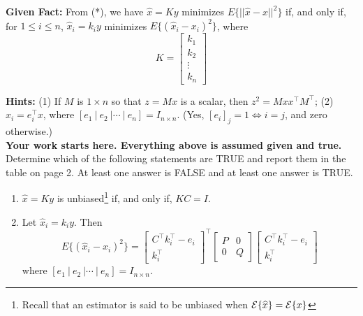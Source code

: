 \documentclass[letterpaper]{article}
\newcommand{\real}{\mathbb R}  %
\begin{document}
\begin{enumerate}
\begin{itemize}
  \end{itemize}

\noindent \textbf{Given Fact:} From (*), we have $\hat{x} = Ky$ minimizes $E\{ ||\hat{x} - x||^2 \} $ if, and only if, for $ 1 \le i \le n$,  $\hat{x}_i = k_i y$ minimizes $ E\{ \left( \hat{x}_i - x_i \right)^2 \}$, where $$K=\left[ \begin{array}{r}  k_1  \\  k_2 \\   \vdots \\ k_n\end{array} \right] $$


\textbf{Hints:} (1)  If $M$ is $1 \times n$ so that $z = Mx$ is a scalar, then $z^2 = M x x^\top M^\top$; (2) $x_i = e_i^\top x$, where $[e_1~|~e_2~| \cdots ~|~e_n] = I_{n \times n}$. (Yes, $[e_i]_j = 1 \Leftrightarrow i = j$, and zero otherwise.)\\




\noindent \textbf{Your work starts here. Everything above is assumed given and true.} Determine which of the following statements are TRUE and report them in the table on page 2. At least one answer is FALSE and at least one answer is TRUE.

        \begin{enumerate}
\setlength{\itemsep}{.1in}
\renewcommand{\labelenumi}{(\alph{enumi})}
\item $\widehat{x} = K y$ is unbiased\footnote{Recall that an estimator is said to be unbiased when ${\cal E} \{\widehat{x} \} = {\cal E} \{ x \}$} if, and only if, $KC=I$.

\item  Let $\widehat{x}_i = k_i y$. Then
$$E\{ \left( \widehat{x}_i - x_i \right)^2 \} =   \left[ \begin{array}{c} C^\top k_i^\top - e_i \\ k_i^\top\end{array} \right]^\top \left[ \begin{array}{cc}  P & 0  \\ 0& Q \end{array} \right] \left[ \begin{array}{c} C^\top k_i^\top - e_i \\ k_i^\top\end{array} \right]$$
where  $[e_1~|~e_2~| \cdots ~|~e_n] = I_{n \times n}$.


\end{enumerate}
\end{enumerate}
\end{document}
